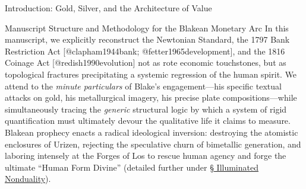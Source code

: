 \documentclass[
  ignorenonframetext,
]{beamer}
\begin{document}
\begin{frame}{Introduction: Gold, Silver, and the Architecture of Value}
\begin{block}{Manuscript Structure and Methodology for the Blakean
Monetary Arc}
\protect{}\label{manuscript-structure-and-methodology-for-the-blakean-monetary-arc}
In this manuscript, we explicitly reconstruct the Newtonian Standard,
the 1797 Bank Restriction Act {[}@clapham1944bank;
@fetter1965development{]}, and the 1816 Coinage Act
{[}@redish1990evolution{]} not as rote economic touchstones, but as
topological fractures precipitating a systemic regression of the human
spirit. We attend to the \emph{minute particulars} of Blake's
engagement---his specific textual attacks on gold, his metallurgical
imagery, his precise plate compositions---while simultaneously tracing
the \emph{generic} structural logic by which a system of rigid
quantification must ultimately devour the qualitative life it claims to
measure. Blakean prophecy enacts a radical ideological inversion:
destroying the atomistic enclosures of Urizen, rejecting the speculative
churn of bimetallic generation, and laboring intensely at the Forges of
Los to rescue human agency and forge the ultimate ``Human Form Divine''
(detailed further under \hyperlink{sec-illuminated-nonduality}{§
Illuminated Nonduality}).


\end{block}
\end{frame}
\end{document}

